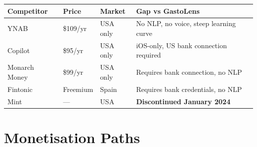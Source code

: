 \documentclass[a4paper,10pt]{article}
\begin{document}
\vspace{4pt}

\begin{tcolorbox}[databox]
{\small
\begin{tabular}{@{}llll@{}}
  \toprule
  {\color{ncyan}Competitor} &
  {\color{ncyan}Price} &
  {\color{ncyan}Market} &
  {\color{ncyan}Gap vs GastoLens} \\
  \midrule
  YNAB          & \$109/yr  & USA only  & No NLP, no voice, steep learning curve \\
  Copilot       & \$95/yr   & USA only  & iOS-only, US bank connection required \\
  Monarch Money & \$99/yr   & USA only  & Requires bank connection, no NLP \\
  Fintonic      & Freemium  & Spain     & Requires bank credentials, no NLP \\
  Mint          & ---       & USA       & \textbf{Discontinued January 2024} \\
  \bottomrule
\end{tabular}
}
\end{tcolorbox}

\newpage

\thispagestyle{empty}

\section{Monetisation Paths}
\end{document}
